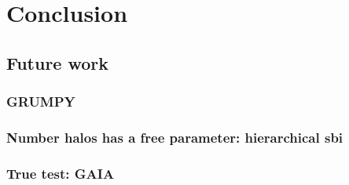 \chapter{Conclusion}

\section{Future work}
\subsection[semianalicit model]{GRUMPY} 
\subsection{Number halos has a free parameter: hierarchical sbi}
\subsection{True test: GAIA}